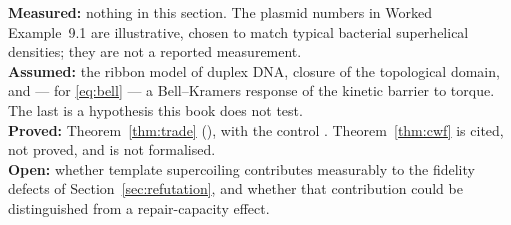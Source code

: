 \begin{ledger}
\textbf{Measured:} nothing in this section. The plasmid numbers in Worked
Example~9.1 are illustrative, chosen to match typical bacterial superhelical
densities; they are not a reported measurement. \\
\textbf{Assumed:} the ribbon model of duplex DNA, closure of the topological
domain, and --- for \eqref{eq:bell} --- a Bell--Kramers response of the kinetic
barrier to torque. The last is a hypothesis this book does not test. \\
\textbf{Proved:} Theorem~\ref{thm:trade} (),
with the control . Theorem~\ref{thm:cwf} is
cited, not proved, and is not formalised. \\
\textbf{Open:} whether template supercoiling contributes measurably to the
fidelity defects of Section~\ref{sec:refutation}, and whether that contribution
could be distinguished from a repair-capacity effect.
\end{ledger}
